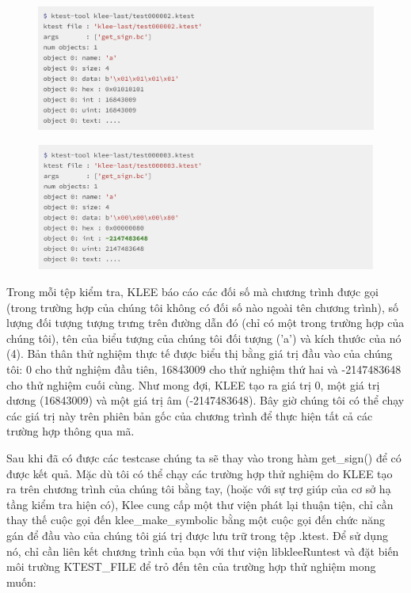 \documentclass[12pt,a4paper]{article}
\begin{document}
\begin{figure}[ht]
\begin{center}
\includegraphics[scale=.3]{hinhanh/test2.png}
\end{center}
\end{figure}

\begin{figure}[ht]
\begin{center}
\includegraphics[scale=.3]{hinhanh/test3.png}
\end{center}
\end{figure}

Trong mỗi tệp kiểm tra, KLEE báo cáo các đối số mà chương trình được gọi (trong trường hợp của chúng tôi không có đối số nào ngoài tên chương trình), số lượng đối tượng tượng trưng trên đường dẫn đó (chỉ có một trong trường hợp của chúng tôi), tên của biểu tượng của chúng tôi đối tượng ('a') và kích thước của nó (4). Bản thân thử nghiệm thực tế được biểu thị bằng giá trị đầu vào của chúng tôi: 0 cho thử nghiệm đầu tiên, 16843009 cho thử nghiệm thứ hai và -2147483648 cho thử nghiệm cuối cùng. Như mong đợi, KLEE tạo ra giá trị 0, một giá trị dương (16843009) và một giá trị âm (-2147483648). Bây giờ chúng tôi có thể chạy các giá trị này trên phiên bản gốc của chương trình để thực hiện tất cả các trường hợp thông qua mã.

Sau khi đã có được các testcase chúng ta sẽ thay vào trong hàm get\_sign() để có được kết quả. Mặc dù tôi có thể chạy các trường hợp thử nghiệm do KLEE tạo ra trên chương trình của chúng tôi bằng tay, (hoặc với sự trợ giúp của cơ sở hạ tầng kiểm tra hiện có), Klee cung cấp một thư viện phát lại thuận tiện, chỉ cần thay thế cuộc gọi đến klee\_make\_symbolic bằng một cuộc gọi đến chức năng gán để đầu vào của chúng tôi giá trị được lưu trữ trong tệp .ktest. Để sử dụng nó, chỉ cần liên kết chương trình của bạn với thư viện libkleeRuntest và đặt biến môi trường KTEST\_FILE để trỏ đến tên của trường hợp thử nghiệm mong muốn:
\end{document}

